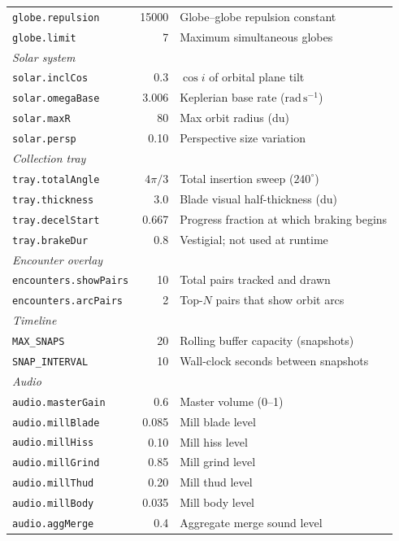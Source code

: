 \documentclass[12pt, a4paper]{article}
\begin{document}
\begin{longtable}{@{}lrl@{}}
  \texttt{globe.repulsion}       & 15000  & Globe--globe repulsion constant \\
  \texttt{globe.limit}           & 7      & Maximum simultaneous globes \\
  \midrule
  \multicolumn{3}{l}{\textit{Solar system}} \\
  \texttt{solar.inclCos}         & 0.3    & $\cos i$ of orbital plane tilt \\
  \texttt{solar.omegaBase}       & 3.006  & Keplerian base rate ($\mathrm{rad\,s^{-1}}$) \\
  \texttt{solar.maxR}            & 80     & Max orbit radius (du) \\
  \texttt{solar.persp}           & 0.10   & Perspective size variation \\
  \midrule
  \multicolumn{3}{l}{\textit{Collection tray}} \\
  \texttt{tray.totalAngle}       & $4\pi/3$ & Total insertion sweep ($240^{\circ}$) \\
  \texttt{tray.thickness}        & 3.0    & Blade visual half-thickness (du) \\
  \texttt{tray.decelStart}       & 0.667  & Progress fraction at which braking begins \\
  \texttt{tray.brakeDur}         & 0.8    & Vestigial; not used at runtime \\
  \midrule
  \multicolumn{3}{l}{\textit{Encounter overlay}} \\
  \texttt{encounters.showPairs}  & 10     & Total pairs tracked and drawn \\
  \texttt{encounters.arcPairs}   & 2      & Top-$N$ pairs that show orbit arcs \\
  \midrule
  \multicolumn{3}{l}{\textit{Timeline}} \\
  \texttt{MAX\_SNAPS}            & 20     & Rolling buffer capacity (snapshots) \\
  \texttt{SNAP\_INTERVAL}        & 10     & Wall-clock seconds between snapshots \\
  \midrule
  \multicolumn{3}{l}{\textit{Audio}} \\
  \texttt{audio.masterGain}      & 0.6    & Master volume (0--1) \\
  \texttt{audio.millBlade}       & 0.085  & Mill blade level \\
  \texttt{audio.millHiss}        & 0.10   & Mill hiss level \\
  \texttt{audio.millGrind}       & 0.85   & Mill grind level \\
  \texttt{audio.millThud}        & 0.20   & Mill thud level \\
  \texttt{audio.millBody}        & 0.035  & Mill body level \\
  \texttt{audio.aggMerge}        & 0.4    & Aggregate merge sound level \\
  \bottomrule
\end{longtable}
\end{document}
